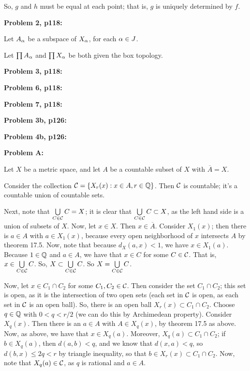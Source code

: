 \documentclass[a4paper,12pt]{article}
\begin{document}
So, $g$ and $h$ must be equal at each point; that is, $g$ is uniquely determined by $f$.

\shunt

{\bf Problem 2, p118:}

Let $A_\alpha$ be a subspace of $X_\alpha$, for each $\alpha \in J$. 

Let $\prod A_\alpha$ and $\prod X_\alpha$ be both given the box topology. 

\shunt

{\bf Problem 3, p118:}

\shunt

{\bf Problem 6, p118:}

\shunt

{\bf Problem 7, p118:}

\shunt

{\bf Problem 3b, p126:}

\shunt

{\bf Problem 4b, p126:}

\shunt

{\bf Problem A:}

Let $X$ be a metric space, and let $A$ be a countable subset of $X$ with $\overline{A} = X$.

Consider the collection $\mathcal{C} = \{X_r(x): x \in A, r \in \mathbb{Q}\}$. Then $\mathcal{C}$ is countable; it's a countable union of countable sets.

Next, note that $\bigcup\limits_{C \in \mathcal{C}} C = X$; it is clear that $\bigcup\limits_{C \in \mathcal{C}} C \subset X$, as the left hand side is a union of subsets of $X$. Now, let $x \in X$. Then $x \in \overline{A}$. Consider $X_1(x)$; then there is $a \in A$ with $a \in X_1(x)$, because every open neighborhood of $x$ intersects $A$ by theorem 17.5. Now, note that because $d_X(a,x) < 1$, we have $x \in X_1(a)$. Because $1 \in \mathbb{Q}$ and $a \in A$, we have that $x \in C$ for some $C \in \mathcal{C}$. That is, $x \in \bigcup\limits_{C \in \mathcal{C}} C$. So, $X \subset  \bigcup\limits_{C \in \mathcal{C}} C$. So $X = \bigcup\limits_{C \in \mathcal{C}} C$.

Now, let $x \in C_1 \cap C_2$ for some $C_1, C_2 \in \mathcal{C}$. Then consider the set $C_1 \cap C_2$; this set is open, as it is the intersection of two open sets (each set in $\mathcal{C}$ is open, as each set in $\mathcal{C}$ is an open ball). So, there is an open ball $X_r(x) \subset C_1 \cap C_2$. Choose $q \in \mathbb{Q}$ with $0<q < r/2$ (we can do this by Archimedean property). Consider $X_{q}(x)$. Then there is an $a \in A$ with $A \in X_{q}(x)$, by theorem 17.5 as above. Now, as above, we have that $x \in X_q(a)$. Moreover, $X_q(a) \subset C_1 \cap C_2$; if $b \in X_q(a)$, then $d(a,b) < q$, and we know that $d(x,a) < q$, so $d(b,x) \leq 2q < r$ by triangle inequality, so that $b \in X_r(x) \subset C_1 \cap C_2$. Now, note that $X_q(a) \in \mathcal{C}$, as $q$ is rational and $a \in A$.
\end{document}
